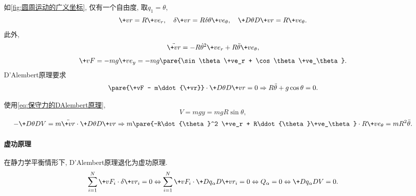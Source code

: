 \documentclass{ctexart}
\begin{document}
\begin{sample}
    \begin{ex}
        如\cref{fig:圆周运动的广义坐标}, 仅有一个自由度, 取$q_1 = \theta$,
        \[ \+vr = R\+ve_r,\quad \delta\+vr = R\delta\theta \+ve_\theta,\quad \+D\theta D{\+vr} = R\+ve_\theta. \]
        此外,
        \[ \ddot{\+vr} = -R\dot{\theta}^2\+ve_r + R\ddot{\theta}\+ve_\theta, \]
        \[ \+vF = -mg\+ve_y = -mg\pare{\sin\theta \+ve_r + \cos\theta \+ve_\theta}. \]
        D'Alembert原理要求
        \[ \pare{\+vF - m\ddot{\+vr}}\cdot\+D\theta D{\+vr} = 0 \Rightarrow R\ddot{\theta} + g\cos\theta = 0. \]
    \end{ex}
    \begin{ex}
        使用\eqref{eq:保守力的DAlembert原理},
        \[ V = mgy = mgR\sin\theta, \]
        \[ -\+D{\theta}D{V} = m\ddot{\+vr}\cdot\+D{\theta}D{\+vr} \Rightarrow m\pare{-R\dot{\theta}^2 \+ve_r + R\ddot{\theta}\+ve_\theta}\cdot R\+ve_\theta = mR^2\ddot{\theta}. \]
    \end{ex}
\end{sample}


\paragraph{虚功原理} %
\label{par:虚功原理}

在静力学平衡情形下, D'Alembert原理退化为虚功原理.
\[ \sum_{i=1}^N \+vF_i \cdot\delta\+vr_i = 0 \Leftrightarrow \sum_{i=1}^N \+vF_i \cdot \+D{q_\alpha}D{\+vr_i} = 0 \Leftrightarrow Q_\alpha = 0 \Leftrightarrow \+D{q_\alpha}DV = 0. \]

\end{document}
